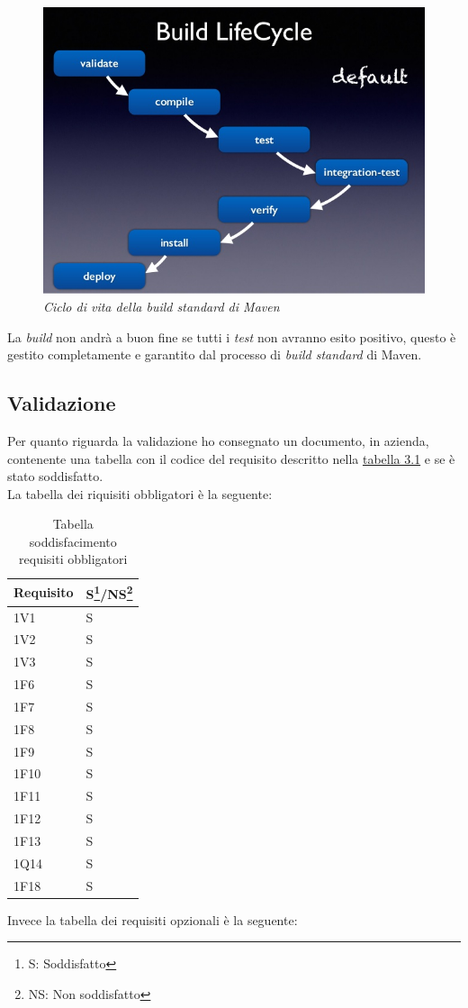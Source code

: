 \begin{figure}[!ht]
	\centering
	\includegraphics[scale=0.4]{immagini/build.jpg}
	\caption{\textit{Ciclo di vita della build standard di Maven }}
\end{figure}

La \textit{build} non andrà a buon fine se tutti i \textit{test} non avranno esito positivo, questo è gestito completamente e garantito dal processo di \textit{build standard} di Maven.
\subsection{Validazione}
\label{sec:valid}
Per quanto riguarda la validazione ho consegnato un documento, in azienda, contenente una tabella con il codice del requisito descritto nella \hyperlink{tab:rec}{tabella 3.1} e se è stato soddisfatto.\\
La tabella dei riquisiti obbligatori è la seguente:

\label{tab:pian}
\begin{table}[!ht]
\begin{tabularx}{.35\textwidth}{XX}
\hline\hline
\textbf{Requisito} & \textbf{S\footnote{S: Soddisfatto}/NS\footnote{NS: Non soddisfatto}} \\
\hline
1V1 & S\\
\hline
1V2 & S\\
\hline
1V3 & S\\
\hline
1F6 & S\\
\hline
1F7 & S\\
\hline
1F8 & S\\
\hline
1F9 & S\\
\hline
1F10 & S\\
\hline
1F11 & S\\
\hline
1F12 & S\\
\hline
1F13 & S\\
\hline
1Q14 & S\\
\hline
1F18 & S\\
\hline
\end{tabularx}
 \captionsetup{singlelinecheck = false, format= hang, justification=raggedright}
\caption{Tabella soddisfacimento requisiti obbligatori}
\end{table}%
\newpage
Invece la tabella dei requisiti opzionali è la seguente:


